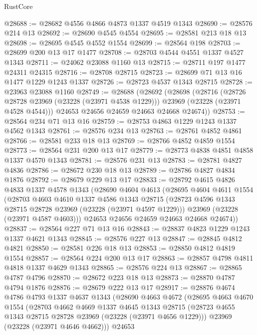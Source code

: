\begin{lexlean}{RustCore}
\begin{coremodule}
@28688 := @28682 @4556 @4866 @4873 @1337 @4519 @1343
@28690 := @28576 @214 @13
@28692 := @28690 @4545 @4554
@28695 := @28581 @213 @18 @13
@28698 := @28695 @4545 @4552 @1554
@28699 := @28564 @198
@28703 := @28699 @200 @13 @17 @1477
@28708 := @28703 @4544 @4551 @1337 @4527 @1343
@28711 := @24062 @23088 @1160 @13
@28715 := @28711 @197 @1477 @24311 @24315
@28716 := @28708 @28715
@28723 := @28699 @71 @13 @16 @1477 @1229 @1243 @1337
@28726 := @28723 @4537 @1343 @28715
@28728 := @23963 @23088 @1160
@28749 := @28688
    (@28692
      (@28698
        (@28716
          (@28726 @28728 @23969 (@23228 (@23971 @4538 @1229)))
          @23969
          (@23228 (@23971 @4528 @4544)))
        @24653
        @24656
        @24659
        @24663
        @24668
        @24674))
@28753 := @28564 @234 @71 @13 @16
@28759 := @28753 @4863 @1229 @1243 @1337 @4562 @1343
@28761 := @28576 @234 @13
@28763 := @28761 @4852 @4861
@28766 := @28581 @233 @18 @13
@28769 := @28766 @4852 @4859 @1554
@28773 := @28564 @231 @200 @13 @17
@28779 := @28773 @4838 @4851 @4858 @1337 @4570 @1343
@28781 := @28576 @231 @13
@28783 := @28781 @4827 @4836
@28786 := @28672 @230 @18 @13
@28789 := @28786 @4827 @4834 @1876
@28792 := @28679 @229 @13 @17
@28833 := @28792
    @4615
    @4826
    @4833
    @1337
    @4578
    @1343
    (@28690
      @4604
      @4613
      (@28695
        @4604
        @4611
        @1554
        (@28703
          @4603
          @4610
          @1337
          @4586
          @1343
          @28715
          (@28723 @4596 @1343 @28715 @28728 @23969 (@23228 (@23971 @4597 @1229)))
          @23969
          (@23228 (@23971 @4587 @4603)))
        @24653
        @24656
        @24659
        @24663
        @24668
        @24674))
@28837 := @28564 @227 @71 @13 @16
@28843 := @28837 @4823 @1229 @1243 @1337 @4621 @1343
@28845 := @28576 @227 @13
@28847 := @28845 @4812 @4821
@28850 := @28581 @226 @18 @13
@28853 := @28850 @4812 @4819 @1554
@28857 := @28564 @224 @200 @13 @17
@28863 := @28857 @4798 @4811 @4818 @1337 @4629 @1343
@28865 := @28576 @224 @13
@28867 := @28865 @4787 @4796
@28870 := @28672 @223 @18 @13
@28873 := @28870 @4787 @4794 @1876
@28876 := @28679 @222 @13 @17
@28917 := @28876
    @4674
    @4786
    @4793
    @1337
    @4637
    @1343
    (@28690
      @4663
      @4672
      (@28695
        @4663
        @4670
        @1554
        (@28703
          @4662
          @4669
          @1337
          @4645
          @1343
          @28715
          (@28723 @4655 @1343 @28715 @28728 @23969 (@23228 (@23971 @4656 @1229)))
          @23969
          (@23228 (@23971 @4646 @4662)))
        @24653

\end{coremodule}
\end{lexlean}
